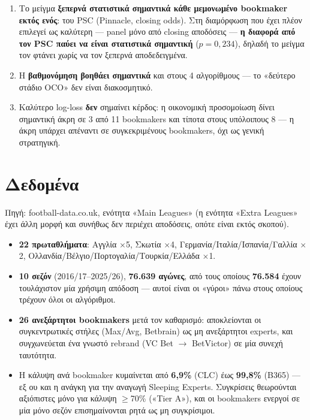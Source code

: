 \documentclass[11pt,a4paper]{article}
\renewcommand{\_}{\oldunderscore\allowbreak}
\begin{document}
\begin{enumerate}
  \item Το μείγμα \textbf{ξεπερνά στατιστικά σημαντικά κάθε μεμονωμένο bookmaker εκτός
        ενός}: του PSC (Pinnacle, closing odds). Στη διαμόρφωση που έχει πλέον επιλεγεί ως
        καλύτερη --- panel μόνο από closing αποδόσεις --- \textbf{η διαφορά από τον PSC
        παύει να είναι στατιστικά σημαντική} ($p=0{,}234$), δηλαδή το μείγμα τον φτάνει
        χωρίς να τον ξεπερνά αποδεδειγμένα.
  \item Η \textbf{βαθμονόμηση βοηθάει σημαντικά} και στους 4 αλγορίθμους --- το «δεύτερο
        στάδιο OCO» δεν είναι διακοσμητικό.
  \item Καλύτερο log-loss \textbf{δεν} σημαίνει κέρδος: η οικονομική προσομοίωση δίνει
        σημαντική άκρη σε 3 από 11 bookmakers και τίποτα στους υπόλοιπους 8 --- η άκρη
        υπάρχει απέναντι σε συγκεκριμένους bookmakers, όχι ως γενική στρατηγική.
\end{enumerate}

\section{Δεδομένα}

Πηγή: football-data.co.uk, ενότητα «Main Leagues» (η ενότητα «Extra Leagues» έχει άλλη μορφή
και συνήθως δεν περιέχει αποδόσεις, οπότε είναι εκτός σκοπού).

\begin{itemize}
  \item \textbf{22 πρωταθλήματα}: Αγγλία $\times$5, Σκωτία $\times$4,
        Γερμανία/Ιταλία/Ισπανία/Γαλλία $\times$2, Ολλανδία/Βέλγιο/Πορτογαλία/Τουρκία/Ελλάδα
        $\times$1.
  \item \textbf{10 σεζόν} (2016/17--2025/26), \textbf{76.639 αγώνες}, από τους οποίους
        \textbf{76.584} έχουν τουλάχιστον μία χρήσιμη απόδοση --- αυτοί είναι οι «γύροι» πάνω
        στους οποίους τρέχουν όλοι οι αλγόριθμοι.
  \item \textbf{26 ανεξάρτητοι bookmakers} μετά τον καθαρισμό: αποκλείονται οι
        συγκεντρωτικές στήλες (Max/Avg, Betbrain) ως μη ανεξάρτητοι experts, και
        συγχωνεύεται ένα γνωστό rebrand (VC Bet $\to$ BetVictor) σε μία συνεχή ταυτότητα.
  \item Η κάλυψη ανά bookmaker κυμαίνεται από \textbf{6,9\%} (CLC) έως \textbf{99,8\%}
        (B365) --- εξ ου και η ανάγκη για την αναγωγή Sleeping Experts. Συγκρίσεις
        θεωρούνται αξιόπιστες μόνο για κάλυψη $\geq$70\% («Tier A»), και οι bookmakers
        ενεργοί σε μία μόνο σεζόν επισημαίνονται ρητά ως μη συγκρίσιμοι.
\end{itemize}
\end{document}
